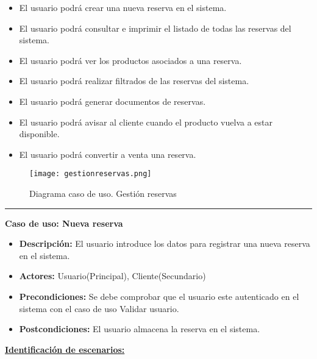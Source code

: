 \begin{itemize}
 \item El usuario podrá crear una nueva reserva en el sistema.
 \item El usuario podrá consultar e imprimir el listado de todas las reservas del sistema.
 \item El usuario podrá ver los productos asociados a una reserva.
 \item El usuario podrá realizar filtrados de las reservas del sistema.
 \item El usuario podrá generar documentos de reservas.
\item El usuario podrá avisar al cliente cuando el producto vuelva a estar disponible.
\item El usuario podrá convertir a venta una reserva.

\end{itemize}
\begin{figure}[H]
  \centering
    \texttt{[image: gestionreservas.png]}
  \caption{Diagrama caso de uso. Gestión reservas}
  \label{cu7}
\end{figure}
\smallskip
\hrule height 1pt
\smallskip
\textbf{Caso de uso: Nueva reserva}
\begin{itemize}\renewcommand{\labelitemi}{$\cdot$}
  \item \textbf{Descripción:} El usuario introduce los datos para registrar una nueva reserva en el sistema.
  \item \textbf{Actores:} Usuario(Principal), Cliente(Secundario)
  \item \textbf{Precondiciones:} Se debe comprobar que el usuario este autenticado en el sistema con el caso de uso Validar usuario.
  \item \textbf{Postcondiciones:} El usuario almacena la reserva en el sistema.
\end{itemize}
\underline{\textbf{Identificación de escenarios:}}
